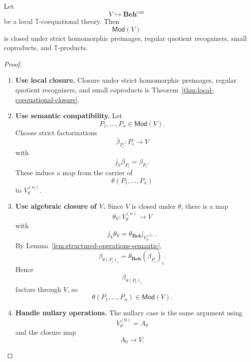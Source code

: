 \begin{theorem}
\label{thm:T-coequational-closure}
    Let
    \[
        V\hookrightarrow\mathbf{Beh}^{\mathrm{can}}
    \]
    be a local \(\mathbb T\)-coequational theory. Then
    \[
        \mathsf{Mod}(V)
    \]
    is closed under strict homomorphic preimages, regular quotient recognizers,
    small coproducts, and \(\mathbb T\)-products.
\end{theorem}

\begin{proof}
    \leavevmode
    \begin{enumerate}
        \item \textbf{Use local closure.}
        Closure under strict homomorphic preimages, regular quotient
        recognizers, and small coproducts is
        Theorem~\ref{thm:local-coequational-closure}.

        \item \textbf{Use semantic compatibility.}
        Let
        \[
            P_1,\dots,P_n\in\mathsf{Mod}(V).
        \]
        Choose strict factorizations
        \[
            \bar\beta_{P_i}:P_i\to V
        \]
        with
        \[
            j_V\bar\beta_{P_i}=\beta_{P_i}.
        \]
        These induce a map from the carrier of
        \[
            \theta(P_1,\dots,P_n)
        \]
        to \(V^{(n)}_\theta\).

        \item \textbf{Use algebraic closure of \(V\).}
        Since \(V\) is closed under \(\theta\), there is a map
        \[
            \theta_V:V^{(n)}_\theta\to V
        \]
        with
        \[
            j_V\theta_V
            =
            \theta_{\mathbf{Beh}}\big|_{V^{(n)}_\theta}.
        \]
        By Lemma~\ref{lem:structured-operations-semantic},
        \[
            \beta_{\theta(P_i)_i}
            =
            \theta_{\mathbf{Beh}}(\beta_{P_i})_i.
        \]
        Hence
        \[
            \beta_{\theta(P_i)_i}
        \]
        factors through \(V\), so
        \[
            \theta(P_1,\dots,P_n)\in\mathsf{Mod}(V).
        \]

        \item \textbf{Handle nullary operations.}
        The nullary case is the same argument using
        \[
            V^{(0)}_\theta=A_0
        \]
        and the closure map
        \[
            A_0\to V.
        \]
    \end{enumerate}
\end{proof}


